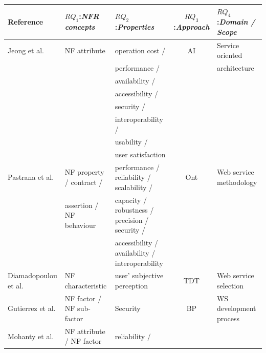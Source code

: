 \documentclass[english,12pt]{article}
\begin{document}
\begin{table}[ht!]
\centering
\scriptsize
\begin{tabular}{l|l|l|c|l}
  \hline 
  \hline
   \textbf{Reference} & \textbf{$RQ_1$:\textit{NFR concepts}} &
   \textbf{$RQ_2$:\textit{Properties}} & \textbf{$RQ_3$:\textit{Approach}} &
   \textbf{$RQ_4$:\textit{Domain / Scope}} 
   \\
  \hline
  \hline  
   Jeong et al. \cite{JeongCL09} & NF attribute     & operation cost / & AI & Service oriented  \\
                                               &                         & performance /   &    &        architecture         \\
                                               &                         & availability /       &    &                                   \\
                                               &                         & accessibility /     &    &                                   \\
                                               &                         & security /            &    &                                   \\
                                               &                         & interoperability / &    &                                   \\
                                               &                         & usability /            &    &                                   \\
                                               &                         & user satisfaction & & \\
  \hline
 Pastrana et al. \cite{PastranaPK11}  & NF property / contract  / & performance / reliability / scalability / & Ont & Web service methodology\\
   &assertion / NF behaviour &  capacity / robustness / precision / security /&  & \\
  &  & accessibility / availability / interoperability    &  & \\    
  \hline
  Diamadopoulou et al. \cite{DiamadopoulouMPS08} & NF characteristic &
  user' subjective perception & TDT & Web service selection  \\ 
  \hline
  Gutierrez et al. \cite{GutierrezRF10} & NF factor / NF sub-factor & Security  & BP &  WS development process
  \\  
  \hline
  Mohanty et al. \cite{MohantyRP10} & NF attribute / NF factor & reliability /

\end{tabular}
\end{table}
\end{document}
